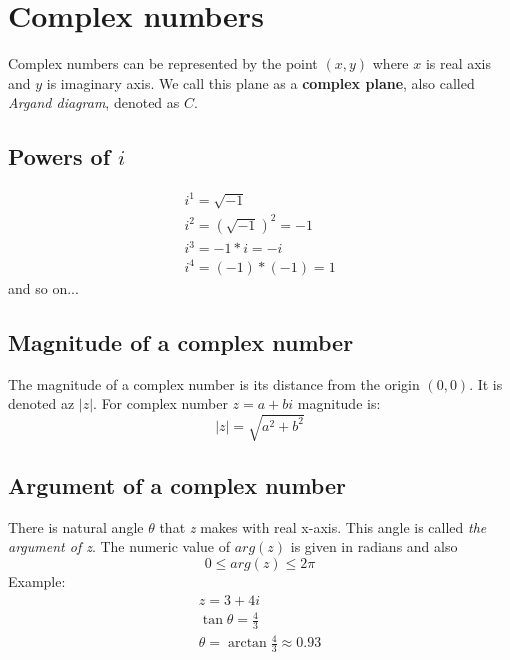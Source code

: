 \documentclass{article}
\begin{document}
\section{Complex numbers}
Complex numbers can be represented by the point $(x, y)$ where $x$ is real axis and $y$
is imaginary axis. We call this plane as a \textbf{complex plane}, also called
\textit{Argand diagram}, denoted as $C$.

\subsection{Powers of $i$}
\begin{equation}
  \begin{gathered}
    i^1 = \sqrt{-1} \\
    i^2 = (\sqrt{-1})^2 = -1 \\
    i^3 = -1 * i = -i \\
    i^4 = (-1) * (-1) = 1
  \end{gathered}
\end{equation}
and so on...

\subsection{Magnitude of a complex number}
The magnitude of a complex number is its distance from the origin $(0, 0)$.
It is denoted az $|z|$. For complex number $z = a + bi$ magnitude is:
\begin{equation}
  |z| = \sqrt{a^2 + b^2}
\end{equation}

\subsection{Argument of a complex number}
There is natural angle $\theta$ that \textit{z} makes with real x-axis. This angle is called \textit{the argument of z}. The numeric value of $arg(z)$ is given in radians and also
\begin{equation}
0 \leq arg(z) \leq 2\pi
\end{equation}
Example:
\begin{equation}
  \begin{gathered}
  z = 3 + 4i \\
  \tan \theta = \frac{4}{3} \\
  \theta = \arctan\frac{4}{3} \approx 0.93
  \end{gathered}
\end{equation}
\end{document}
